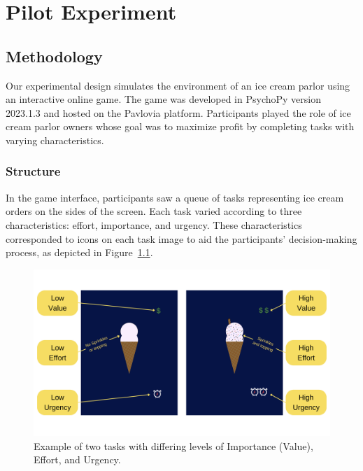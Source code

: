 \documentclass[
]{report}
\begin{document}
\hypertarget{pilot-experiment}{%
\chapter{Pilot Experiment}\label{pilot-experiment}}

\hypertarget{methodology}{%
\section{Methodology}\label{methodology}}

Our experimental design simulates the environment of an ice cream parlor
using an interactive online game. The game was developed in PsychoPy
version 2023.1.3 and hosted on the Pavlovia platform. Participants
played the role of ice cream parlor owners whose goal was to maximize
profit by completing tasks with varying characteristics.

\hypertarget{structure}{%
\subsection{Structure}\label{structure}}

In the game interface, participants saw a queue of tasks representing
ice cream orders on the sides of the screen. Each task varied according
to three characteristics: effort, importance, and urgency. These
characteristics corresponded to icons on each task image to aid the
participants' decision-making process, as depicted in
Figure~\ref{fig-choice}.

\begin{figure}

{\centering \includegraphics{images/tasks_example.png}

}

\caption{\label{fig-choice}Example of two tasks with differing levels of
Importance (Value), Effort, and Urgency.}

\end{figure}
\end{document}
